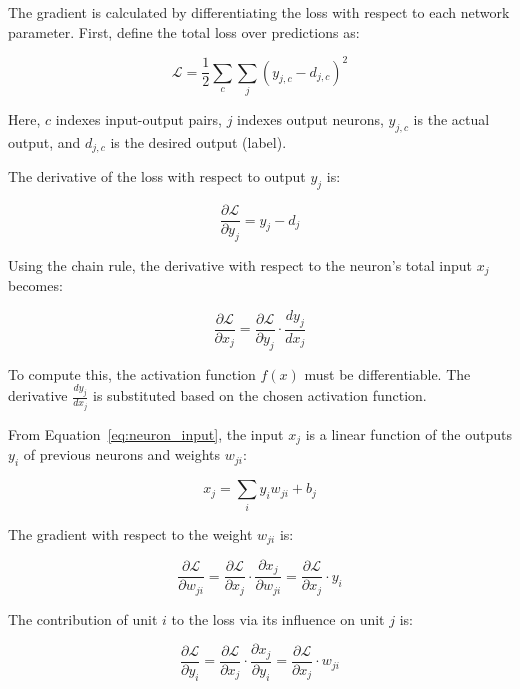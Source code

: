 \documentclass[a4paper,oneside]{book}
\theoremstyle{definition}
\begin{document}
The gradient is calculated by differentiating the loss with respect to each network parameter. First, define the total loss over predictions as:

\begin{equation}
\mathcal{L} = \frac{1}{2} \sum_{c} \sum_{j} (y_{j,c} - d_{j,c})^2
\label{eq:loss_function}
\end{equation}

Here, \( c \) indexes input-output pairs, \( j \) indexes output neurons, \( y_{j,c} \) is the actual output, and \( d_{j,c} \) is the desired output (label).

The derivative of the loss with respect to output \( y_j \) is:

\begin{equation}
\frac{\partial \mathcal{L}}{\partial y_j} = y_j - d_j
\label{eq:loss_derivative_output}
\end{equation}

Using the chain rule, the derivative with respect to the neuron's total input \( x_j \) becomes:

\begin{equation}
\frac{\partial \mathcal{L}}{\partial x_j} = \frac{\partial \mathcal{L}}{\partial y_j} \cdot \frac{dy_j}{dx_j}
\label{eq:chain_rule}
\end{equation}

To compute this, the activation function \( f(x) \) must be differentiable. The derivative \( \frac{dy_j}{dx_j} \) is substituted based on the chosen activation function.

From Equation~\eqref{eq:neuron_input}, the input \( x_j \) is a linear function of the outputs \( y_i \) of previous neurons and weights \( w_{ji} \):

\begin{equation}
x_j = \sum_i y_i w_{ji} + b_j
\end{equation}

The gradient with respect to the weight \( w_{ji} \) is:

\begin{equation}
\frac{\partial \mathcal{L}}{\partial w_{ji}} = \frac{\partial \mathcal{L}}{\partial x_j} \cdot \frac{\partial x_j}{\partial w_{ji}} = \frac{\partial \mathcal{L}}{\partial x_j} \cdot y_i
\label{eq:gradient_weight}
\end{equation}

The contribution of unit \( i \) to the loss via its influence on unit \( j \) is:

\begin{equation}
\frac{\partial \mathcal{L}}{\partial y_i} = \frac{\partial \mathcal{L}}{\partial x_j} \cdot \frac{\partial x_j}{\partial y_i} = \frac{\partial \mathcal{L}}{\partial x_j} \cdot w_{ji}
\label{eq:gradient_output}
\end{equation}
\end{document}
